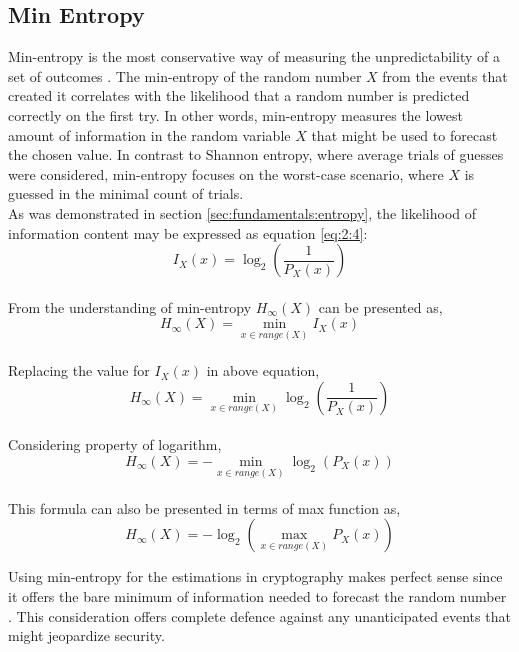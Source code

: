 %
%
\subsection{Min Entropy}
\label{subsec:fundamentals:types:min}

Min-entropy is the most conservative way of measuring the unpredictability of a set of outcomes \cite{SP90B-2018}. The min-entropy of the random number $X$ from the events that created it correlates with the likelihood that a random number is predicted correctly on the first try. In other words, min-entropy measures the lowest amount of information in the random variable $X$ that might be used to forecast the chosen value. In contrast to Shannon entropy, where average trials of guesses were considered, min-entropy focuses on the worst-case scenario, where $X$ is guessed in the minimal count of trials.\\
As was demonstrated in section \ref{sec:fundamentals:entropy}, the likelihood of information content may be expressed as equation \ref{eq:2:4}: 
\begin{equation*}
I_{X}(x) = \log_{2}\left(\frac{1}{P_{X}(x)}\right)
\end{equation*}\\
From the understanding of min-entropy $H_{\infty}(X)$ can be presented as,
\begin{equation*}
	H_{\infty}(X) = \min_{x \in range(X)} I_{X}(x)
\end{equation*}\\
Replacing the value for $I_{X}(x)$ in above equation,
\begin{equation*}
	H_{\infty}(X) = \min_{x \in range(X)} \log_{2}\left(\frac{1}{P_{X}(x)}\right)
\end{equation*}\\
Considering property of logarithm,
\begin{equation}\label{eq:2:7}
H_{\infty}(X) = {-}\min_{x \in range(X)} \log_{2}\left(P_{X}(x)\right)
\end{equation}\\
This formula can also be presented in terms of max function as,
\begin{equation}\label{eq:2:8}
H_{\infty}(X) = {-}\log_{2}\left(\max_{x \in range(X)} P_{X}(x)\right)
\end{equation}

Using min-entropy for the estimations in cryptography makes perfect sense since it offers the bare minimum of information needed to forecast the random number \cite{SP90B-2018}. This consideration offers complete defence against any unanticipated events that might jeopardize security.

